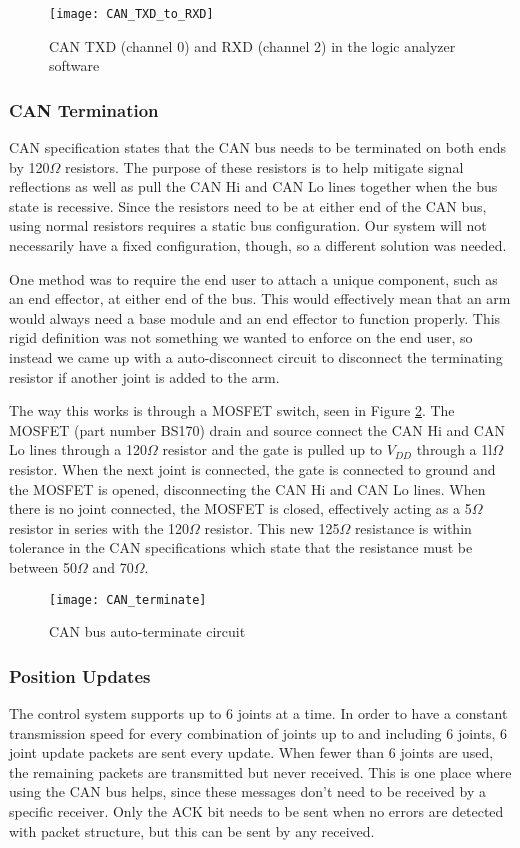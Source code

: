 \begin{figure}[H]
	\centering
	\texttt{[image: CAN\_TXD\_to\_RXD]}
	\caption{CAN TXD (channel 0) and RXD (channel 2) in the logic analyzer software}
	\label{fig:can_TXD_RXD}
\end{figure}

\subsubsection{CAN Termination}
CAN specification states that the CAN bus needs to be terminated on both ends by 120$\Omega$ resistors. The purpose of these resistors is to help mitigate signal reflections as well as pull the CAN Hi and CAN Lo lines together when the bus state is recessive. Since the resistors need to be at either end of the CAN bus, using normal resistors requires a static bus configuration. Our system will not necessarily have a fixed configuration, though, so a different solution was needed.

\noindent One method was to require the end user to attach a unique component, such as an end effector, at either end of the bus. This would effectively mean that an arm would always need a base module and an end effector to function properly. This rigid definition was not something we wanted to enforce on the end user, so instead we came up with a auto-disconnect circuit to disconnect the terminating resistor if another joint is added to the arm.

\noindent The way this works is through a MOSFET switch, seen in Figure \ref{fig:can_terminate_circ}. The MOSFET (part number BS170) drain and source connect the CAN Hi and CAN Lo lines through a 120$\Omega$ resistor and the gate is pulled up to $V_{DD}$ through a 1l$\Omega$ resistor. When the next joint is connected, the gate is connected to ground and the MOSFET is opened, disconnecting the CAN Hi and CAN Lo lines. When there is no joint connected, the MOSFET is closed, effectively acting as a 5$\Omega$ resistor in series with the 120$\Omega$ resistor. This new 125$\Omega$ resistance is within tolerance in the CAN specifications which state that the resistance must be between 50$\Omega$ and 70$\Omega$.

\begin{figure}[H]
	\centering
	\texttt{[image: CAN\_terminate]}
	\caption{CAN bus auto-terminate circuit}
	\label{fig:can_terminate_circ}
\end{figure}

\subsubsection{Position Updates}
The control system supports up to 6 joints at a time. In order to have a constant transmission speed for every combination of joints up to and including 6 joints, 6 joint update packets are sent every update. When fewer than 6 joints are used, the remaining packets are transmitted but never received. This is one place where using the CAN bus helps, since these messages don't need to be received by a specific receiver. Only the ACK bit needs to be sent when no errors are detected with packet structure, but this can be sent by any received. 

